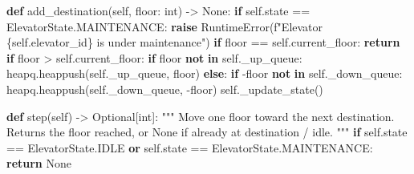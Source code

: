\documentclass[11pt]{article}
\newenvironment{Shaded}{\begin{snugshade}}{\end{snugshade}}
\newcommand{\BuiltInTok}[1]{\textcolor[rgb]{0.50,0.55,0.55}{#1}}
\newcommand{\CommentTok}[1]{\textcolor[rgb]{0.48,0.49,0.49}{#1}}
\newcommand{\ControlFlowTok}[1]{\textcolor[rgb]{0.99,0.74,0.29}{\textbf{#1}}}
\newcommand{\KeywordTok}[1]{\textcolor[rgb]{0.81,0.81,0.76}{\textbf{#1}}}
\newcommand{\NormalTok}[1]{\textcolor[rgb]{0.81,0.81,0.76}{#1}}
\newcommand{\OperatorTok}[1]{\textcolor[rgb]{0.81,0.81,0.76}{#1}}
\newcommand{\PreprocessorTok}[1]{\textcolor[rgb]{0.15,0.68,0.38}{#1}}
\newcommand{\SpecialCharTok}[1]{\textcolor[rgb]{0.24,0.68,0.91}{#1}}
\newcommand{\SpecialStringTok}[1]{\textcolor[rgb]{0.85,0.27,0.33}{#1}}
\newcommand{\VariableTok}[1]{\textcolor[rgb]{0.15,0.68,0.68}{#1}}
\begin{document}
\begin{Shaded}
\begin{Highlighting}[]
    \KeywordTok{def}\NormalTok{ add\_destination(}\VariableTok{self}\NormalTok{, floor: }\BuiltInTok{int}\NormalTok{) }\OperatorTok{{-}\textgreater{}} \VariableTok{None}\NormalTok{:}
        \ControlFlowTok{if} \VariableTok{self}\NormalTok{.state }\OperatorTok{==}\NormalTok{ ElevatorState.MAINTENANCE:}
            \ControlFlowTok{raise} \PreprocessorTok{RuntimeError}\NormalTok{(}\SpecialStringTok{f"Elevator }\SpecialCharTok{\{}\VariableTok{self}\SpecialCharTok{.}\NormalTok{elevator\_id}\SpecialCharTok{\}}\SpecialStringTok{ is under maintenance"}\NormalTok{)}
        \ControlFlowTok{if}\NormalTok{ floor }\OperatorTok{==} \VariableTok{self}\NormalTok{.current\_floor:}
            \ControlFlowTok{return}
        \ControlFlowTok{if}\NormalTok{ floor }\OperatorTok{\textgreater{}} \VariableTok{self}\NormalTok{.current\_floor:}
            \ControlFlowTok{if}\NormalTok{ floor }\KeywordTok{not} \KeywordTok{in} \VariableTok{self}\NormalTok{.\_up\_queue:}
\NormalTok{                heapq.heappush(}\VariableTok{self}\NormalTok{.\_up\_queue, floor)}
        \ControlFlowTok{else}\NormalTok{:}
            \ControlFlowTok{if} \OperatorTok{{-}}\NormalTok{floor }\KeywordTok{not} \KeywordTok{in} \VariableTok{self}\NormalTok{.\_down\_queue:}
\NormalTok{                heapq.heappush(}\VariableTok{self}\NormalTok{.\_down\_queue, }\OperatorTok{{-}}\NormalTok{floor)}
        \VariableTok{self}\NormalTok{.\_update\_state()}

    \KeywordTok{def}\NormalTok{ step(}\VariableTok{self}\NormalTok{) }\OperatorTok{{-}\textgreater{}}\NormalTok{ Optional[}\BuiltInTok{int}\NormalTok{]:}
        \CommentTok{"""}
\CommentTok{        Move one floor toward the next destination.}
\CommentTok{        Returns the floor reached, or None if already at destination / idle.}
\CommentTok{        """}
        \ControlFlowTok{if} \VariableTok{self}\NormalTok{.state }\OperatorTok{==}\NormalTok{ ElevatorState.IDLE }\KeywordTok{or} \VariableTok{self}\NormalTok{.state }\OperatorTok{==}\NormalTok{ ElevatorState.MAINTENANCE:}
            \ControlFlowTok{return} \VariableTok{None}


\end{Highlighting}
\end{Shaded}
\end{document}
